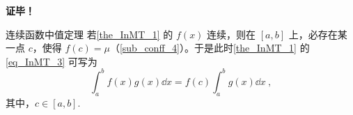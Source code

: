 \textbf{证毕！}

\begin{example}{连续函数中值定理}
若\autoref{the_InMT_1} 的 $f(x)$ 连续，则在 $[a,b]$ 上，必存在某一点 $c$，使得 $f(c)=\mu$（\autoref{sub_conff_4}）。于是此时\autoref{the_InMT_1} 的\autoref{eq_InMT_3} 可写为
\begin{equation}
\int_a^b f(x)g(x)\dd x=f(c)\int_a^b g(x)\dd x~,
\end{equation}
其中，$c\in[a,b].$
\end{example}
